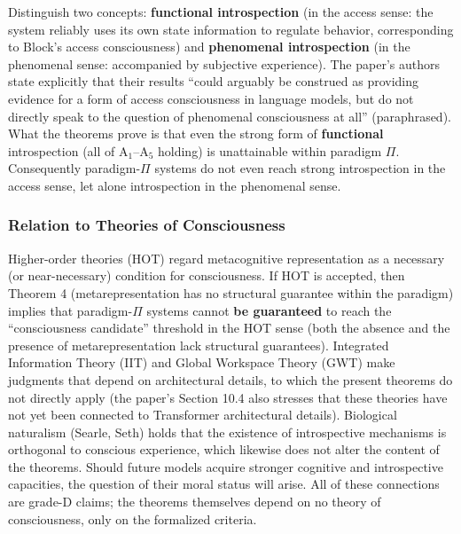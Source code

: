 Distinguish two concepts: \textbf{functional introspection} (in the access sense: the system
reliably uses its own state information to regulate behavior, corresponding to Block's access
consciousness\cite{block-1995}) and \textbf{phenomenal introspection} (in the phenomenal
sense: accompanied by subjective experience). The paper's authors state explicitly that their
results ``could arguably be construed as providing evidence for a form of access
consciousness in language models, but do not directly speak to the question of phenomenal
consciousness at all'' (paraphrased)\cite{lindsey-2026-introspection}.
What the theorems prove is that even the strong form of \textbf{functional}
introspection (all of $\mathrm{A}_1$--$\mathrm{A}_5$ holding) is unattainable within paradigm
$\Pi$. Consequently paradigm-$\Pi$ systems do not even reach strong introspection in the
access
sense, let alone introspection in the phenomenal sense.

\subsubsection{Relation to Theories of Consciousness}

Higher-order theories (HOT) regard metacognitive representation as a necessary (or
near-necessary) condition for consciousness\cite{rosendahl-2005, lau-rosenthal-2011,
carruthers-2017}. If HOT is accepted, then Theorem 4 (metarepresentation has no structural
guarantee within the paradigm) implies that paradigm-$\Pi$ systems cannot \textbf{be
guaranteed} to reach the ``consciousness candidate'' threshold in the HOT sense (both the
absence and the presence of metarepresentation lack structural guarantees). Integrated
Information Theory (IIT)\cite{tononi-2004, albantakis-2023-iit} and Global Workspace Theory
(GWT)\cite{baars-1993, baars-1997} make judgments that depend on architectural details, to which the present theorems do not directly apply (the paper's Section 10.4 also
stresses that these theories have not yet been connected to Transformer architectural
details\cite{lindsey-2026-introspection}). Biological naturalism
(Searle\cite{searle-1992}, Seth\cite{seth-2024}) holds that the existence of introspective
mechanisms is orthogonal to conscious experience, which likewise does not alter the content
of the theorems. Should future models acquire stronger cognitive and introspective capacities,
the question of their moral status will arise\cite{long-2024-welfare}. All of these
connections are grade-D claims; the theorems themselves depend on no theory of
consciousness, only on the formalized criteria.

